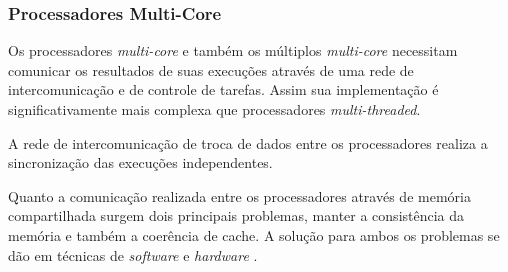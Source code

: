 \subsubsection{Processadores Multi-Core}

Os processadores \textit{multi-core} e também os múltiplos
\textit{multi-core} necessitam comunicar os resultados de suas execuções
através de uma rede de intercomunicação e de controle de tarefas.
Assim sua implementação é significativamente mais complexa que processadores
\textit{multi-threaded}.

A rede de intercomunicação de troca de dados entre os processadores realiza a
sincronização das execuções independentes.

Quanto a comunicação realizada entre os processadores através de memória
compartilhada surgem dois principais problemas, manter a consistência da memória
e também a coerência de cache.
A solução para ambos os problemas se dão em técnicas de \textit{software} e
\textit{hardware} \cite{eopc}.
